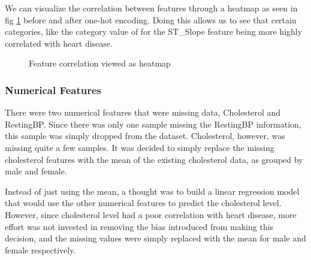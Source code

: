 \documentclass[12pt,conference]{IEEEtran}
\begin{document}
We can visualize the correlation between features through a heatmap as seen in fig \ref{fig:one-hot-heatmap} before and after one-hot encoding. Doing this allows us to see that certain categories, like the category value of  for the ST\_Slope feature being more highly correlated with heart disease.

\begin{figure}%
    \centering
    \qquad
    \caption{Feature correlation viewed as heatmap}%
    \label{fig:one-hot-heatmap}%
\end{figure}

\subsubsection{Numerical Features}
There were two numerical features that were missing data, Cholesterol and RestingBP. Since there was only one sample missing the RestingBP information, this sample was simply dropped from the dataset. Cholesterol, however, was missing quite a few samples. It was decided to simply replace the missing cholesterol features with the mean of the existing cholesterol data, as grouped by male and female. 

Instead of just using the mean, a thought was to build a linear regression model that would use the other numerical features to predict the cholesterol level. However, since cholesterol level had a poor correlation with heart disease, more effort was not invested in removing the bias introduced from making this decision, and the missing values were simply replaced with the mean for male and female respectively.
\end{document}
